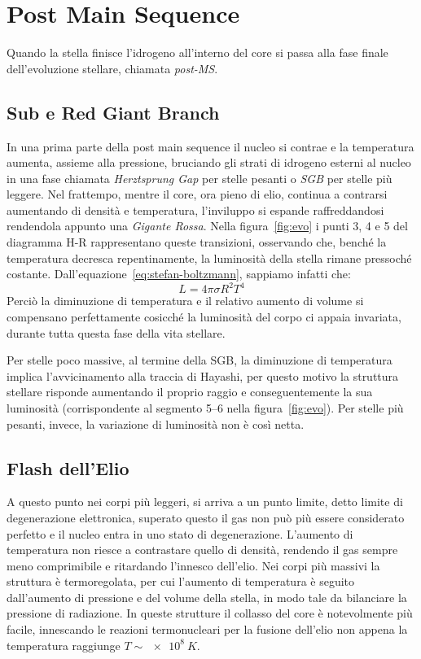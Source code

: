 \section{Post Main Sequence}\label{sec:post-main-sequence}
Quando la stella finisce l'idrogeno all'interno del core si passa alla fase finale dell'evoluzione stellare, chiamata \emph{post-MS}. 

\subsection{Sub e Red Giant Branch}\label{sec:SGB-RGB}
In una prima parte della post main sequence il nucleo si contrae e la temperatura aumenta, assieme alla pressione, bruciando gli strati di idrogeno esterni al nucleo in una fase chiamata \textit{Herztsprung Gap} per stelle pesanti o \emph{SGB} per stelle più leggere. Nel frattempo, mentre il core, ora pieno di elio, continua a contrarsi aumentando di densità e temperatura, l'inviluppo si espande raffreddandosi rendendola appunto una \emph{Gigante Rossa}. Nella figura~\ref{fig:evo} i punti 3, 4 e 5 del diagramma H-R rappresentano queste transizioni, osservando che, benché la temperatura decresca repentinamente, la luminosità della stella rimane pressoché costante. Dall'equazione~\eqref{eq:stefan-boltzmann}, sappiamo infatti che:
\[
    L = 4\pi \sigma R^2 T^4
\]
Perciò la diminuzione di temperatura e il relativo aumento di volume si compensano perfettamente cosicché la luminosità del corpo ci appaia invariata, durante tutta questa fase della vita stellare.

Per stelle poco massive, al termine della SGB, la diminuzione di temperatura implica l'avvicinamento alla traccia di Hayashi, per questo motivo la struttura stellare risponde aumentando il proprio raggio e conseguentemente la sua luminosità (corrispondente al segmento 5--6 nella figura~\ref{fig:evo}). Per stelle più pesanti, invece, la variazione di luminosità non è così netta. 
\subsection{Flash dell'Elio}\label{sec:flash-He e Horizontal Branch}

A questo punto nei corpi più leggeri, si arriva a un punto limite, detto limite di degenerazione elettronica, superato questo il gas non può più essere considerato perfetto e il nucleo entra in uno stato di degenerazione. L'aumento di temperatura non riesce a contrastare quello di densità, rendendo il gas sempre meno comprimibile e ritardando l'innesco dell'elio. Nei corpi più massivi la struttura è termoregolata, per cui l'aumento di temperatura è seguito dall'aumento di pressione e del volume della stella, in modo tale da bilanciare la pressione di radiazione. In queste strutture il collasso del core è notevolmente più facile, innescando le reazioni termonucleari per la fusione dell'elio non appena la temperatura raggiunge $T \sim \SI{e8}{K}$.

